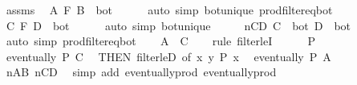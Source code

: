 \begin{isabellebody}
\ assms\ \isamarkupfalse%
\ {\isachardoublequoteopen}A\ {\isasymtimes}\isactrlsub F\ B\ {\isasymnoteq}\ bot{\isachardoublequoteclose}\isanewline
\ \ \ \ \isamarkupfalse%
\ {\isacharparenleft}{\kern0pt}auto\ simp{\isacharcolon}{\kern0pt}\ bot{\isacharunderscore}{\kern0pt}unique\ prod{\isacharunderscore}{\kern0pt}filter{\isacharunderscore}{\kern0pt}eq{\isacharunderscore}{\kern0pt}bot{\isacharparenright}{\kern0pt}\isanewline
\ \ \isamarkupfalse%
\ {\isacharasterisk}{\kern0pt}\ \isamarkupfalse%
\ {\isachardoublequoteopen}C\ {\isasymtimes}\isactrlsub F\ D\ {\isasymnoteq}\ bot{\isachardoublequoteclose}\isanewline
\ \ \ \ \isamarkupfalse%
\ {\isacharparenleft}{\kern0pt}auto\ simp{\isacharcolon}{\kern0pt}\ bot{\isacharunderscore}{\kern0pt}unique{\isacharparenright}{\kern0pt}\isanewline
\ \ \isamarkupfalse%
\ \isamarkupfalse%
\ nCD{\isacharcolon}{\kern0pt}\ {\isachardoublequoteopen}C\ {\isasymnoteq}\ bot{\isachardoublequoteclose}\ {\isachardoublequoteopen}D\ {\isasymnoteq}\ bot{\isachardoublequoteclose}\isanewline
\ \ \ \ \isamarkupfalse%
\ {\isacharparenleft}{\kern0pt}auto\ simp{\isacharcolon}{\kern0pt}\ prod{\isacharunderscore}{\kern0pt}filter{\isacharunderscore}{\kern0pt}eq{\isacharunderscore}{\kern0pt}bot{\isacharparenright}{\kern0pt}\isanewline
\isanewline
\ \ \isamarkupfalse%
\ {\isachardoublequoteopen}A\ {\isasymle}\ C{\isachardoublequoteclose}\isanewline
\ \ \isamarkupfalse%
\ {\isacharparenleft}{\kern0pt}rule\ filter{\isacharunderscore}{\kern0pt}leI{\isacharparenright}{\kern0pt}\isanewline
\ \ \ \ \isamarkupfalse%
\ P\ \isamarkupfalse%
\ {\isachardoublequoteopen}eventually\ P\ C{\isachardoublequoteclose}\ \isamarkupfalse%
\ {\isacharasterisk}{\kern0pt}{\isacharbrackleft}{\kern0pt}THEN\ filter{\isacharunderscore}{\kern0pt}leD{\isacharcomma}{\kern0pt}\ of\ {\isachardoublequoteopen}{\isasymlambda}{\isacharparenleft}{\kern0pt}x{\isacharcomma}{\kern0pt}\ y{\isacharparenright}{\kern0pt}{\isachardot}{\kern0pt}\ P\ x{\isachardoublequoteclose}{\isacharbrackright}{\kern0pt}\ \isamarkupfalse%
\ {\isachardoublequoteopen}eventually\ P\ A{\isachardoublequoteclose}\isanewline
\ \ \ \ \ \ \isamarkupfalse%
\ nAB\ nCD\ \isamarkupfalse%
\ {\isacharparenleft}{\kern0pt}simp\ add{\isacharcolon}{\kern0pt}\ eventually{\isacharunderscore}{\kern0pt}prod{}\ eventually{\isacharunderscore}{\kern0pt}prod{}{\isacharparenright}{\kern0pt}\isanewline

\end{isabellebody}
